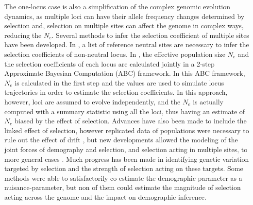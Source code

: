 \documentclass[12pt]{article}
\begin{document}
The one-locus case is also a simplification of the complex genomic evolution dynamics, as multiple loci can have their allele frequency changes determined by selection and, selection on multiple sites can affect the genome in complex ways, reducing the $N_{e}$. Several methods to infer the selection coefficient of multiple sites have been developed. In \cite{Nishino:2013if}, a list of reference neutral sites are necessary to infer the selection coefficients of non-neutral locus. In \cite{Foll:2014kv,Foll:2015ce}, the effective population size $N_{e}$ and the selection coefficients of each locus are calculated jointly in a 2-step Approximate Bayesian Computation (ABC) framework. In this ABC framework, $N_{e}$ is calculated in the first step and the values are used to simulate locus trajectories in order to estimate the selection coefficients. In this approach, however, loci are assumed to evolve independently, and the $N_{e}$ is actually computed with a summary statistic using all the loci, thus having an estimate of $N_{e}$ biased by the effect of selection. Advances have also been made to include the linked effect of selection, however replicated data of populations were necessary to rule out the effect of drift \citep{Terhorst:2015cg}, but new developments allowed the modeling of the joint forces of demography and selection, and selection acting in multiple sites, to more general cases \citep{Schraiber:2016ks, FerrerAdmetlla:2016jc}. Much progress has been made in identifying genetic variation targeted by selection and the strength of selection acting on these targets. Some methods were able to satisfactorily co-estimate the demographic parameter as a nuisance-parameter, but non of them could estimate the magnitude of selection acting across the genome and the impact on demographic inference.
\end{document}
